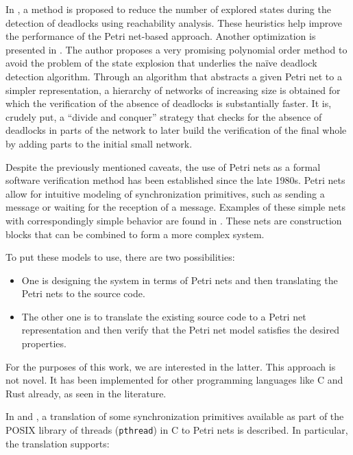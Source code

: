 \documentclass[../Thesis.tex]{subfiles}
\begin{document}
In \cite{karatkevich2014deadlock}, a method is proposed
to reduce the number of explored states
during the detection of deadlocks using reachability analysis.
These heuristics help improve the performance of the Petri net-based approach.
Another optimization is presented in \cite{kungas2005petri}.
The author proposes a very promising polynomial order method to avoid the problem
of the state explosion that underlies the naïve deadlock detection algorithm.
Through an algorithm that abstracts a given Petri net to a simpler representation,
a hierarchy of networks of increasing size is obtained
for which the verification of the absence of deadlocks is substantially faster.
It is, crudely put, a ``divide and conquer'' strategy
that checks for the absence of deadlocks in parts of the network
to later build the verification of the final whole
by adding parts to the initial small network.

Despite the previously mentioned caveats,
the use of Petri nets as a formal software verification method
has been established since the late 1980s.
Petri nets allow for intuitive modeling of synchronization primitives,
such as sending a message or waiting for the reception of a message.
Examples of these simple nets with correspondingly simple behavior
are found in \cite{heiner1992petri}.
These nets are construction blocks that can be combined to form a more complex system.

To put these models to use, there are two possibilities:

\begin{itemize}
    \item One is designing the system in terms of Petri nets
          and then translating the Petri nets to the source code.
    \item The other one is to translate the existing source code to a Petri net representation
          and then verify that the Petri net model satisfies the desired properties.
\end{itemize}

For the purposes of this work, we are interested in the latter.
This approach is not novel.
It has been implemented for other programming languages like C and Rust already,
as seen in the literature.

In \cite{kavi2002modeling} and \cite{moshtaghi2001},
a translation of some synchronization primitives available as part of
the POSIX library of threads (\texttt{pthread}) in C to Petri nets is described.
In particular, the translation supports:
\end{document}
